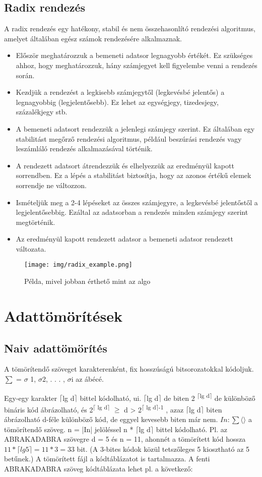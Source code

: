 \documentclass[margin=0px]{article}
\begin{document}
\subsection{Radix rendezés}
A radix rendezés egy hatékony, stabil és nem összehasonlító rendezési algoritmus, amelyet általában egész számok rendezésére alkalmaznak.
\begin{itemize}
    \item Először meghatározzuk a bemeneti adatsor legnagyobb értékét. Ez szükséges ahhoz, hogy meghatározzuk, hány számjegyet kell figyelembe venni a rendezés során.
    \item Kezdjük a rendezést a legkisebb számjegytől (legkevésbé jelentős) a legnagyobbig (legjelentősebb). Ez lehet az egységjegy, tizedesjegy, százalékjegy stb.
    \item A bemeneti adatsort rendezzük a jelenlegi számjegy szerint. Ez általában egy stabilitást megőrző rendezési algoritmus, például beszúrási rendezés vagy leszámláló rendezés alkalmazásával történik.
    \item A rendezett adatsort átrendezzük és elhelyezzük az eredményül kapott sorrendben. Ez a lépés a stabilitást biztosítja, hogy az azonos értékű elemek sorrendje ne változzon.
    \item Ismételjük meg a 2-4 lépéseket az összes számjegyre, a legkevésbé jelentőstől a legjelentősebbig. Ezáltal az adatsorban a rendezés minden számjegy szerint megtörténik.
    \item Az eredményül kapott rendezett adatsor a bemeneti adatsor rendezett változata.
\end{itemize}
\begin{figure}[H]
    \centering
    \texttt{[image: img/radix\_example.png]}
    \caption{Példa, mivel jobban érthető mint az algo}
\end{figure}

\section{Adattömörítések}
\subsection{Naiv adattömörítés}
A tömörítendő szöveget karakterenként, fix hosszúságú bitsorozatokkal kódoljuk.
$\sum$ = $\sigma$ 1, $\sigma$2, . . . , $\sigma$i az ábécé.

Egy-egy karakter $\lceil$lg d$\rceil$ bittel kódolható, ui. $\lceil$lg d$\rceil$ de biten 2
\textsuperscript{$\lceil$lg d$\rceil$} de különböző bináris kód ábrázolható, és 2\textsuperscript{$\lceil$ lg d$\rceil$} $\geqslant$  d > 2\textsuperscript{$\lceil$ lg d$\rceil$-1}
, azaz $\lceil$lg d$\rceil$ biten ábrázolható
d-féle különböző kód, de eggyel kevesebb biten már nem.
$In : \sum \langle \rangle$  a tömörítendő szöveg. n = |In| jelöléssel n * $\lceil$lg d$\rceil$ bittel kódolható.
Pl. az ABRAKADABRA szövegre d = 5 és n = 11, ahonnét a tömörített
kód hossza $11 * \lceil lg 5 \rceil = 11 * 3 = 33$ bit. (A 3-bites kódok közül tetszőleges 5
kiosztható az 5 betűnek.) A tömörített fájl a kódtáblázatot is tartalmazza.
A fenti ABRAKADABRA szöveg kódtáblázata lehet pl. a következő:
\end{document}
